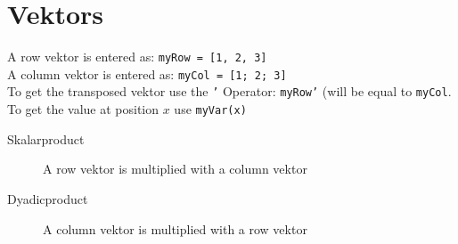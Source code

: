 \section{Vektors}

A row vektor is entered as: \texttt{myRow = [1, 2, 3]}\\
A column vektor is entered as: \texttt{myCol = [1; 2; 3]}\\
To get the transposed vektor use the \texttt{'} Operator: \texttt{myRow'} (will be equal to \texttt{myCol}.\\
To get the value at position $x$ use \texttt{myVar(x)}\\
\begin{description}
 \item [Skalarproduct] A row vektor is multiplied with a column vektor
 \item [Dyadicproduct] A column vektor is multiplied with a row vektor
\end{description}

